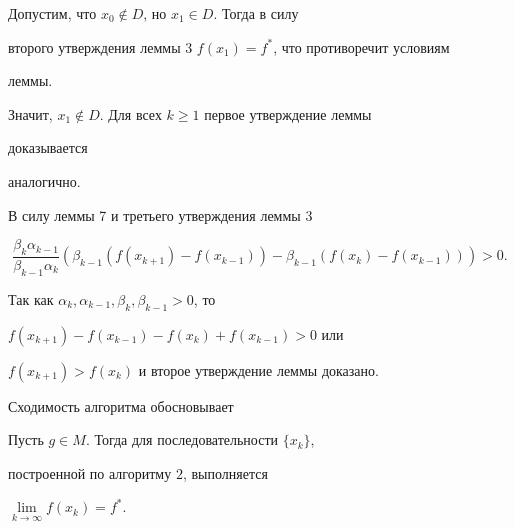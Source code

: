 \begin{pf} Допустим, что $x_0\notin D$, но $x_1\in D$. Тогда в силу 


второго утверждения леммы 3\; $f(x_1)=f^*$, что противоречит условиям 


леммы. 


Значит, $x_1\notin D$. Для всех $k\ge 1$ первое утверждение леммы 


доказывается 


аналогично. 


 


В силу леммы 7 и третьего утверждения леммы 3 


$$ 


\frac{\beta_k\alpha_{k-1}}{\beta_{k-1}\alpha_k} 


(\beta_{k-1}(f(x_{k+1})-f(x_{k-1}))- 


\beta_{k-1}(f(x_k)-f(x_{k-1})))>0. 


$$ 


Так как $\alpha_k,\alpha_{k-1},\beta_k,\beta_{k-1}>0$, то 


$f(x_{k+1})-f(x_{k-1})-f(x_k)+f(x_{k-1})>0$ или 


$f(x_{k+1})>f(x_k)$ и второе утверждение леммы доказано. 


\end{pf} 


 


Сходимость алгоритма обосновывает 


 


\begin{thm} Пусть $g\in M$. Тогда для последовательности $\{x_k\}$, 


построенной по алгоритму $2$, выполняется 


$\lim\limits_{k\to\infty}f(x_k)=f^*$. 


\end{thm} 


 


